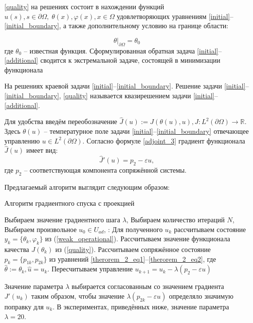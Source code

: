 \documentclass[10pt]{article}
\begin{document}
\eqref{quality} на решениях  состоит в нахождении функций $u(s), s \in \partial \Omega,\; \theta(x), \varphi(x), x \in \Omega$ удовлетворяющих уравнениям \eqref{initial}--\eqref{initial_boundary}, а также дополнительному условию на границе области:

\begin{equation}
	\label{additional}
	\theta|_{\partial \Omega} = \theta_0
\end{equation}
где $\theta_0$ -- известная функция. Сформулированная обратная задача \eqref{initial}--\eqref{additional} сводится к экстремальной задаче, состоящей в минимизации функционала

На решениях краевой задачи \eqref{initial}--\eqref{initial_boundary}. Решение задачи \eqref{initial}--\eqref{initial_boundary}, \eqref{quality} называется квазирешением задачи \eqref{initial}--\eqref{additional}.

Для удобства введём переобозначение $\hat{J}(u):=J(\theta(u),u), \hat{J}:L^2(\partial \Omega) \to \mathbb{R}$. Здесь $\theta(u)$ -- температурное поле задачи  \eqref{initial}--\eqref{initial_boundary} отвечающее управлению $u \in L^2(\partial \Omega)$.  
Согласно формуле \eqref{adjoint_3} градиент функционала $\hat J(u)$ имеет вид:
\begin{equation}
	\label{j_gradient}
	\hat J'(u) = p_2 - \varepsilon u, 
\end{equation}
где $p_2$ -- соответствующая компонента сопряжённой системы.

Предлагаемый алгоритм выглядит следующим образом:
\begin{algorithm}[H]
\caption{Алгоритм градиентного спуска с проекцией}
\begin{algorithmic}[1]
\State Выбираем значение градиентного шага $\lambda$,
\State Выбираем количество итераций $N$,
\State Выбираем произвольное $u_0 \in U_{ad}$,
: 
\State Для полученного $u_k$ рассчитываем состояние $y_k = \{\theta_k, \varphi_k\}$ из  (\ref{weak_operational}).  
\State Рассчитываем значение функционала качества $J(\theta_k)$ из (\ref{quality}).
\State Рассчитываем сопряжённое состояние $p_k=\{p_{1k},p_{2k}\}$ из уравнений \eqref{therorem_2_eq1}--\eqref{therorem_2_eq2}, где $ \hat{\theta} := \theta_k, \hat{u}=u_k$.  
\State Пересчитываем управление $u_{k+1} =  u_k - \lambda (p_2 - \varepsilon u)$
\EndFor 
\end{algorithmic} 
\end{algorithm}

Значение параметра $\lambda$ выбирается согласованным со значением градиента $J'(u_k)$ таким образом, чтобы значение $\lambda(p_{2k}-\varepsilon u)$ определяло значимую поправку для $u_k$. В экспериментах, приведённых ниже, значение параметра $\lambda = 20$. 
\end{document}
